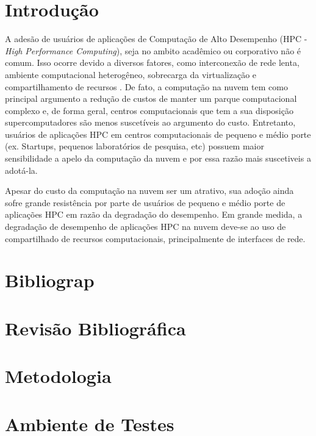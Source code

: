 \documentclass[11pt, titlepage]{article}
\begin{document}
\section{Introdução}
\label{MPSection:44EB7A3A-0A0A-4C54-8447-1F6D5347559F}

A adesão de usuários de aplicações de Computação de Alto Desempenho (HPC - \emph{High Performance Computing}), seja no ambito acadêmico ou corporativo não é comum. Isso ocorre devido a diversos fatores, como interconexão de rede lenta, ambiente computacional heterogêneo, sobrecarga da virtualização e compartilhamento de recursos  . De fato, a computação na nuvem tem como principal argumento a redução de custos de manter um parque computacional complexo e, de forma geral, centros computacionais que tem a sua disposição supercomputadores são menos suscetíveis ao argumento do custo. Entretanto, usuários de aplicações HPC em centros computacionais de pequeno e médio porte (ex. Startups, pequenos laboratórios de pesquisa, etc) possuem maior sensibilidade a apelo da computação da nuvem e por essa razão mais suscetiveis a adotá-la.

Apesar do custo da computação na nuvem ser um atrativo, sua adoção ainda sofre grande resistência por parte de usuários de pequeno e médio porte de aplicações HPC em razão da degradação do desempenho. Em grande medida, a degradação de desempenho de aplicações HPC na nuvem deve-se ao uso de compartilhado de recursos computacionais, principalmente de interfaces de rede.



\section{Bibliograp}
\label{MPSection:EFC085AC-3D7A-48DF-E988-4F7FD8E6C8DB}

\section{Revisão Bibliográfica}
\label{MPSection:FA9A33D4-490F-406D-84E8-2BDA22A0F52D}



\section{Metodologia}
\label{MPSection:E3D67007-0EDE-487B-B714-6F004A58F4A3}



\section{Ambiente de Testes}
\label{MPSection:640E517E-5F30-41FD-9883-196E5C5C4E6E}





\section{}
\label{MPSection:681BA355-A6E6-49C3-CA78-2C39615C42BA}
\end{document}
